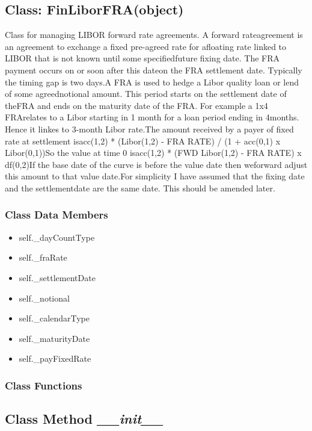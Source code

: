 \documentclass[twoside,11pt]{book}
\begin{document}
\subsection{Class: FinLiborFRA(object)}
Class for managing LIBOR forward rate agreements. A forward rateagreement is an agreement to exchange a fixed pre-agreed rate for afloating rate linked to LIBOR that is not known until some specifiedfuture fixing date. The FRA payment occurs on or soon after this dateon the FRA settlement date. Typically the timing gap is two days.A FRA is used to hedge a Libor quality loan or lend of some agreednotional amount. This period starts on the settlement date of theFRA and ends on the maturity date of the FRA. For example a 1x4 FRArelates to a Libor starting in 1 month for a loan period ending in 4months. Hence it linkes to 3-month Libor rate.The amount received by a payer of fixed rate at settlement isacc(1,2) * (Libor(1,2) - FRA RATE) / (1 + acc(0,1) x Libor(0,1))So the value at time 0 isacc(1,2) * (FWD Libor(1,2) - FRA RATE) x df(0,2)If the base date of the curve is before the value date then weforward adjust this amount to that value date.For simplicity I have assumed that the fixing date and the settlementdate are the same date. This should be amended later. 

\subsubsection{Class Data Members}
\begin{itemize}
\item{self.\_dayCountType}
\item{self.\_fraRate}
\item{self.\_settlementDate}
\item{self.\_notional}
\item{self.\_calendarType}
\item{self.\_maturityDate}
\item{self.\_payFixedRate}
\end{itemize}

\subsubsection{Class Functions}

\subsection{Class Method {\it \_\_init\_\_}}
\end{document}
